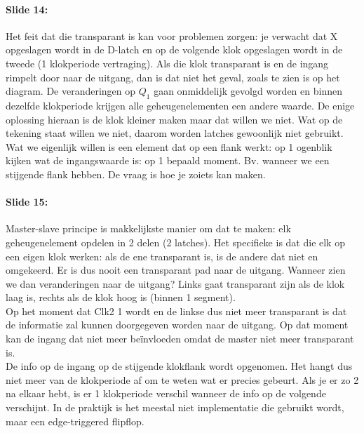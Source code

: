 \documentclass[10pt,a4paper]{book}
\begin{document}
\paragraph{Slide 14:}  Het feit dat die transparant is kan voor problemen zorgen: je verwacht dat X opgeslagen wordt in de D-latch en op de volgende klok opgeslagen wordt in de tweede (1 klokperiode vertraging). Als die klok transparant is en de ingang rimpelt door naar de uitgang, dan is dat niet het geval, zoals te zien is op het diagram. De veranderingen op $Q_1$ gaan onmiddelijk gevolgd worden en binnen dezelfde klokperiode krijgen alle geheugenelementen een andere waarde. De enige oplossing hieraan is de klok kleiner maken maar dat willen we niet. Wat op de tekening staat willen we niet, daarom worden latches gewoonlijk niet gebruikt.\\
Wat we eigenlijk willen is een element dat op een flank werkt: op 1 ogenblik kijken wat de ingangswaarde is: op 1 bepaald moment. Bv. wanneer we een stijgende flank hebben. De vraag is hoe je zoiets kan maken.

\paragraph{Slide 15:} Master-slave principe is makkelijkste manier om dat te maken: elk geheugenelement opdelen in 2 delen (2 latches). Het specifieke is dat die elk op een eigen klok werken: als de ene transparant is, is de andere dat niet en omgekeerd. Er is dus nooit een transparant pad naar de uitgang. Wanneer zien we dan veranderingen naar de uitgang? Links gaat transparant zijn als de klok laag is, rechts als de klok hoog is (binnen 1 segment).\\
Op het moment dat Clk2 1 wordt en de linkse dus niet meer transparant is dat de informatie zal kunnen doorgegeven worden naar de uitgang. Op dat moment kan de ingang dat niet meer be\"invloeden omdat de master niet meer transparant is.\\
De info op de ingang op de stijgende klokflank wordt opgenomen. Het hangt dus niet meer van de klokperiode af om te weten wat er precies gebeurt. Als je er zo 2 na elkaar hebt, is er 1 klokperiode verschil wanneer de info op de volgende verschijnt. In de praktijk is het meestal niet implementatie die gebruikt wordt, maar een edge-triggered flipflop.
\end{document}
